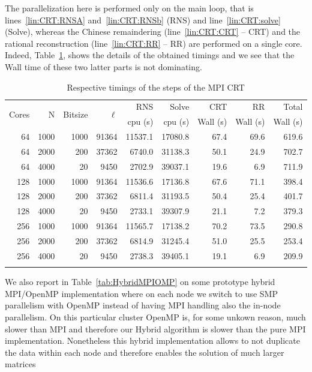 The parallelization here is performed only on the main loop,
that is lines~\ref{lin:CRT:RNSA} and~\ref{lin:CRT:RNSb} (RNS) and
line~\ref{lin:CRT:solve} (Solve), whereas the Chinese remaindering
(line~\ref{lin:CRT:CRT} -- CRT) 
and the rational reconstruction (line~\ref{lin:CRT:RR} -- RR) are
performed on a single core. 
Indeed, Table~\ref{tab:MPICRT}, shows the details of the obtained
timings and we see that the Wall time of these two latter parts is not
dominating.


\begin{table}[htb]
\renewcommand{\arraystretch}{1.1}
\begin{tabular}{rrrrrrrrr}
\hline
\multirow{2}{*}{Cores} & \multirow{2}{*}{N}& \multirow{2}{*}{Bitsize}
& \multirow{2}{*}{$\ell$}& RNS & Solve & CRT& RR & Total \\
 & &  & & cpu (s) & cpu (s) & Wall (s)& Wall (s) & Wall (s) \\
\hline
 64  & 1000 & 1000 & 91364 & 11537.1 & 17080.8 & 67.4 & 69.6 & 619.6 \\
 64  & 2000 & 200& 37362 & 6740.0 & 31138.3 & 50.1 & 24.9 & 702.7 \\
 64  & 4000 & 20 & 9450& 2702.9 & 39037.1 & 19.6 & 6.9& 711.9 \\
 128 & 1000 & 1000 & 91364 & 11536.6 & 17136.8 & 67.6 & 71.1 & 398.4 \\
 128 & 2000 & 200& 37362 & 6811.4 & 31193.5 & 50.4 & 25.4& 401.7 \\
 128 & 4000 & 20 & 9450& 2733.1 & 39307.9 & 21.1 & 7.2& 379.3 \\
 256 & 1000 & 1000 & 91364 & 11565.7 & 17138.2 & 70.2 & 73.5& 290.8 \\
 256 & 2000 & 200& 37362 & 6814.9 & 31245.4 & 51.0 & 25.5 & 253.4 \\
 256 & 4000 & 20 & 9450& 2738.3 & 39405.1 & 19.1 & 6.9& 209.9 \\
\hline
\vspace{0pt}
\end{tabular}
\caption{Respective timings of the steps of the MPI CRT}\label{tab:MPICRT}
\end{table}

We also report in Table~\ref{tab:HybridMPIOMP} on some prototype
hybrid MPI/OpenMP implementation where on each node we switch to use
SMP parallelism with OpenMP instead of having MPI handling also the
in-node parallelism. On this particular cluster OpenMP is, for some
unkown reason, much slower than MPI and therefore our Hybrid algorithm
is slower than the pure MPI implementation. Nonetheless this hybrid
implementation allows to not duplicate the data within each node and
therefore enables the solution of much larger matrices 

